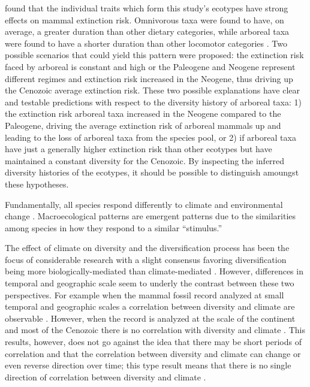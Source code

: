 \documentclass[12pt,letterpaper]{article}
\begin{document}
\citet{Smits2015b} found that the individual traits which form this study's ecotypes have strong effects on mammal extinction risk. Omnivorous taxa were found to have, on average, a greater duration than other dietary categories, while arboreal taxa were found to have a shorter duration than other locomotor categories \citep{Smits2015b}. Two possible scenarios that could yield this pattern were proposed: the extinction risk faced by arboreal is constant and high or the Paleogene and Neogene represent different regimes and extinction risk increased in the Neogene, thus driving up the Cenozoic average extinction risk. These two possible explanations have clear and testable predictions with respect to the diversity history of arboreal taxa: 1) the extinction risk arboreal taxa increased in the Neogene compared to the Paleogene, driving the average extinction risk of arboreal mammals up and leading to the loss of arboreal taxa from the species pool, or 2) if arboreal taxa have just a generally higher extinction risk than other ecotypes but have maintained a constant diversity for the Cenozoic. By inspecting the inferred diversity histories of the ecotypes, it should be possible to distinguish amoungst these hypotheses.





Fundamentally, all species respond differently to climate and environmental change \citep{Blois2009}. Macroecological patterns are emergent patterns due to the similarities among species in how they respond to a similar ``stimulus.''

The effect of climate on diversity and the diversification process has been the focus of considerable research with a slight consensus favoring diversification being more biologically-mediated than climate-mediated \citep{Alroy1996a,Alroy2000g,Figueirido2012,Clyde1998a}. However, differences in temporal and geographic scale seem to underly the contrast between these two perspectives. For example when the mammal fossil record analyzed at small temporal and geographic scales a correlation between diversity and climate are observable \citep{Clyde1998a}. However, when the record is analyzed at the scale of the continent and most of the Cenozoic there is no correlation with diversity and climate \citep{Alroy2000g}. This results, however, does not go against the idea that there may be short periods of correlation and that the correlation between diversity and climate can change or even reverse direction over time; this type result means that there is no single direction of correlation between diversity and climate \citep{Figueirido2012}. 
\end{document}
